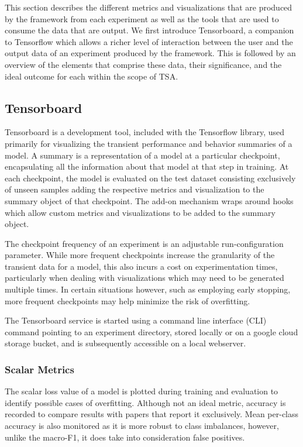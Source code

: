 \documentclass[../../fyp.tex]{subfiles}
\begin{document}
This section describes the different metrics and visualizations that are produced by the framework from each experiment as well as the tools that are used to consume the data that are output. We first introduce Tensorboard, a companion to Tensorflow which allows a richer level of interaction between the user and the output data of an experiment produced by the framework. This is followed by an overview of the elements that comprise these data, their significance, and the ideal outcome for each within the scope of TSA. 

\subsection{Tensorboard}
Tensorboard is a development tool, included with the Tensorflow library, used primarily for visualizing the transient performance and behavior summaries of a model. A summary is a representation of a model at a particular checkpoint, encapsulating all the information about that model at that step in training. At each checkpoint, the model is evaluated on the test dataset consisting exclusively of unseen samples adding the respective metrics and visualization to the summary object of that checkpoint. The add-on mechanism wraps around hooks which allow custom metrics and visualizations to be added to the summary object.

The checkpoint frequency of an experiment is an adjustable run-configuration parameter. While more frequent checkpoints increase the granularity of the transient data for a model, this also incurs a cost on experimentation times, particularly when dealing with visualizations which may need to be generated multiple times. In certain situations however, such as employing early stopping, more frequent checkpoints may help minimize the risk of overfitting.
 
The Tensorboard service is started using a command line interface (CLI) command pointing to an experiment directory, stored locally or on a google cloud storage bucket, and is subsequently accessible on a local webserver.   

\subsubsection{Scalar Metrics}
The scalar loss value of a model is plotted during training and evaluation to identify possible cases of overfitting. Although not an ideal metric, accuracy is recorded to compare results with papers that report it exclusively. Mean per-class accuracy is also monitored as it is more robust to class imbalances, however, unlike the macro-F1, it does take into consideration false positives. 
\end{document}

